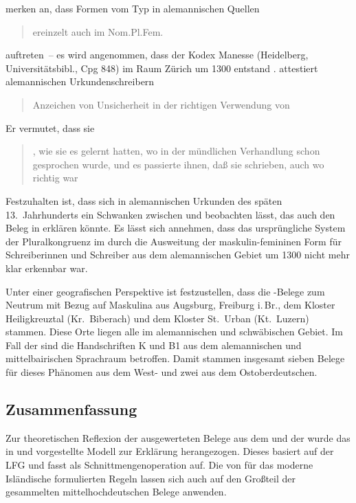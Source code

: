 \citet[485]{ksw2} merken an, dass Formen vom Typ  in
alemannischen Quellen \blockquote{ereinzelt auch im
Nom.Pl.Fem.} auftreten~-- es wird angenommen, dass der Kodex Manesse
(Heidelberg, Universitätsbibl., Cpg 848) im Raum Zürich
um 1300 entstand \autocite[4957]{hsc}.  attestiert
alemannischen Urkundenschreibern \blockquote{Anzeichen von
Unsicherheit in der richtigen Verwendung von }. Er vermutet, dass
sie \blockcquote[28]{deboor1976b}{ , wie sie es
gelernt hatten, wo in der mündlichen Verhandlung schon
 gesprochen wurde, und es passierte ihnen, daß sie 
schrieben, auch wo  richtig war}.

Festzuhalten ist, dass sich in alemannischen Urkunden des
späten 13.~Jahrhunderts ein Schwanken zwischen  und 
beobachten lässt, das auch den Beleg in  erklären
könnte. Es lässt sich annehmen, dass das ursprüngliche System der
Pluralkongruenz im  durch die Ausweitung der maskulin-femininen
Form für Schreiberinnen und Schreiber aus dem
alemannischen Gebiet um 1300 nicht mehr klar erkennbar war.

Unter einer geografischen Perspektive ist festzustellen,
dass die \CAO{}-Belege zum Neutrum mit Bezug auf Maskulina aus Augsburg,
Freiburg i.\,Br., dem Kloster Heiligkreuztal (Kr.~Biberach) und dem Kloster
St.~Urban (Kt.~Luzern) stammen. Diese Orte liegen alle im
alemannischen und schwäbischen Gebiet. Im Fall
der \KC{} sind die Handschriften K und B1 aus dem alemannischen
und mittelbairischen Sprachraum betroffen. Damit stammen insgesamt
sieben Belege für dieses Phänomen aus dem West- und zwei aus dem
Ost\-ober\-deutschen.


\subsection{Zusammenfassung}

Zur theoretischen Reflexion der ausgewerteten Belege aus dem \CAO{} und der
\KC{} wurde das in \citet{wechsler2009} und \citet{wechslerzlatic2003}
vorgestellte Modell zur Erklärung herangezogen. Dieses basiert auf der
LFG und fasst  als
Schnittmengenoperation auf. Die von \citet[186]{wechslerzlatic2003}
\citet[578]{wechsler2009} für das moderne Isländische
formulierten Regeln lassen sich auch auf den Großteil der gesammelten
mittelhochdeutschen Belege anwenden.


